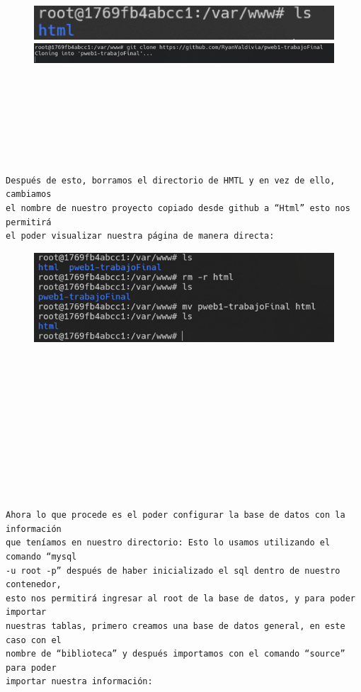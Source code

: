 \documentclass{article}
\begin{document}
\begin{figure}[h]
    \centering
    \includegraphics[width=1\textwidth]{img/8.png}
    \includegraphics[width=1\textwidth]{img/9.png}
    \label{fig:imagen}
\end{figure}





\begin{flushleft}
\begin{verbatim}







Después de esto, borramos el directorio de HMTL y en vez de ello, cambiamos 
el nombre de nuestro proyecto copiado desde github a “Html” esto nos permitirá
el poder visualizar nuestra página de manera directa:
\end{verbatim}
\end{flushleft}

\begin{figure}[h]
    \centering
    \includegraphics[width=1\textwidth]{img/10.png}
    \label{fig:imagen}
\end{figure}




\begin{flushleft}
\begin{verbatim}











Ahora lo que procede es el poder configurar la base de datos con la información
que teníamos en nuestro directorio: Esto lo usamos utilizando el comando “mysql 
-u root -p” después de haber inicializado el sql dentro de nuestro contenedor, 
esto nos permitirá ingresar al root de la base de datos, y para poder importar 
nuestras tablas, primero creamos una base de datos general, en este caso con el
nombre de “biblioteca” y después importamos con el comando “source” para poder
importar nuestra información:
\end{verbatim}
\end{flushleft}
\end{document}
